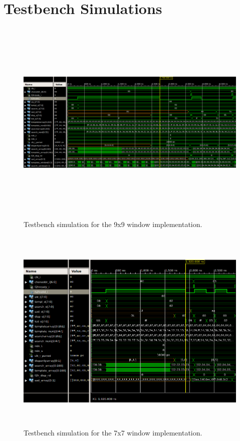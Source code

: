 \chapter{Testbench Simulations}
\label{sec:appdxF}

\begin{figure}
	\begin{center}
		\includegraphics[height=100mm]{figures/testbench_simulation_9x9.png}
		\captionfonts
		\caption{Testbench simulation for the 9x9 window implementation.}
		\label{fig:tb_9x9}
	\end{center}
\end{figure}


\begin{figure}
	\begin{center}
		\includegraphics[height=100mm]{figures/testbench_simulation_7x7.png}
		\captionfonts
		\caption{Testbench simulation for the 7x7 window implementation.}
		\label{fig:tb_7x7}
	\end{center}
\end{figure}